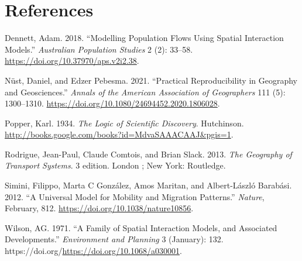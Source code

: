 \documentclass[11pt,letterpaper]{article}
\newlength{\cslhangindent}
\newlength{\cslentryspacingunit} %
\newenvironment{CSLReferences}[2] %
 {%
  \setlength{\parindent}{0pt}
  \ifodd #1
  \let\oldpar\par
  \def\par{\hangindent=\cslhangindent\oldpar}
  \fi
  \setlength{\parskip}{#2\cslentryspacingunit}
 }%
 {}
\begin{document}
\hypertarget{references}{%
\section*{References}\label{references}}

\hypertarget{refs}{}
\begin{CSLReferences}{1}{0}
\leavevmode{}%
Dennett, Adam. 2018. {``Modelling Population Flows Using Spatial Interaction Models.''} \emph{Australian Population Studies} 2 (2): 33--58. \url{https://doi.org/10.37970/aps.v2i2.38}.

\leavevmode{}%
Nüst, Daniel, and Edzer Pebesma. 2021. {``Practical Reproducibility in Geography and Geosciences.''} \emph{Annals of the American Association of Geographers} 111 (5): 1300--1310. \url{https://doi.org/10.1080/24694452.2020.1806028}.

\leavevmode{}%
Popper, Karl. 1934. \emph{The Logic of Scientific Discovery}. Hutchinson. \url{http://books.google.com/books?id=MdvaSAAACAAJ\&pgis=1}.

\leavevmode{}%
Rodrigue, Jean-Paul, Claude Comtois, and Brian Slack. 2013. \emph{The Geography of Transport Systems}. 3 edition. London ; New York: Routledge.

\leavevmode{}%
Simini, Filippo, Marta C González, Amos Maritan, and Albert-László Barabási. 2012. {``A Universal Model for Mobility and Migration Patterns.''} \emph{Nature}, February, 812. \url{https://doi.org/10.1038/nature10856}.

\leavevmode{}%
Wilson, AG. 1971. {``A Family of Spatial Interaction Models, and Associated Developments.''} \emph{Environment and Planning} 3 (January): 132. https://doi.org/\url{https://doi.org/10.1068/a030001}.

\end{CSLReferences}




\setlength{\bibsep}{0.00cm plus 0.05cm} %


\end{document}
